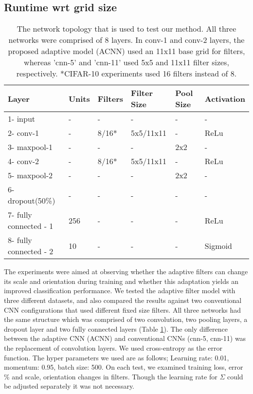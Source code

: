 \documentclass{bmvc2k}
\begin{document}
\subsection{Runtime wrt grid size}



\begin{table}
\centering
\caption{The network topology that is used to test our method. All three networks were comprised of 8 layers. In conv-1 and conv-2 layers, the proposed adaptive model (ACNN) used an 11x11 base grid for filters, whereas 'cnn-5' and 'cnn-11' used 5x5 and 11x11 filter sizes, respectively. *CIFAR-10 experiments used 16 filters instead of 8.}
\bigskip
\begin{tabular}{ | l | l | l | l | l | l |}
	\hline
	Layer & Units & Filters & Filter Size & Pool Size & Activation \\ \hline
	1- input & - & - & - & - & - \\ \hline
	2- conv-1 & - & 8/16* & 5x5/11x11 & - & ReLu \\ \hline
	3- maxpool-1 & - & - & - & 2x2 & - \\ \hline
	4- conv-2 & - & 8/16* & 5x5/11x11 & - & ReLu \\ \hline
	5- maxpool-2 & - & - & - & 2x2 & - \\ \hline
	6- dropout(50\%) & - & - & - & - & - \\ \hline
	7- fully connected - 1 & 256 & - & - & - & ReLu \\ \hline
	8- fully connected - 2 & 10 & - & - & - & Sigmoid \\ \hline
\end{tabular}
\label{table:network}

\end{table}


The experiments were aimed at observing whether the adaptive filters can change its scale and orientation during training and whether this adaptation yields an improved classification performance. We tested the adaptive filter model with three different datasets, and also compared the results against two conventional CNN configurations that used different fixed size filters. All three networks had the same structure which was comprised of two convolution, two pooling layers, a dropout layer and two fully connected layers (Table \ref{table:network}). The only difference between the adaptive CNN (ACNN) and conventional CNNs (cnn-5, cnn-11) was the replacement of convolution layers. We used cross-entropy as the error function.
The hyper parameters we used are as follows; Learning rate: 0.01, momentum: 0.95, batch size: 500. On each test, we examined training loss, error \% and scale, orientation changes in filters. Though the learning rate for $\Sigma$ could be adjusted separately it was not necessary.
\end{document}
